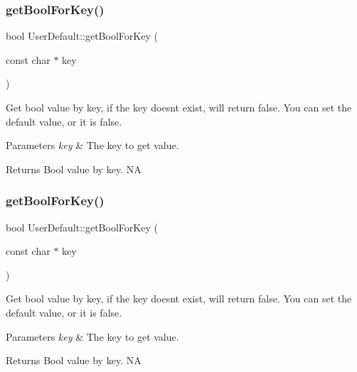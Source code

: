 \subsubsection{\texorpdfstring{get\+Bool\+For\+Key()}{getBoolForKey()}\hspace{0.1cm}{\footnotesize\ttfamily [1/4]}}
{\footnotesize\ttfamily bool User\+Default\+::get\+Bool\+For\+Key (\begin{DoxyParamCaption}\item[{const char $\ast$}]{key }\end{DoxyParamCaption})}

Get bool value by key, if the key doesn\textquotesingle{}t exist, will return false. You can set the default value, or it is false. 
\begin{DoxyParams}{Parameters}
{\em key} & The key to get value. \\
\hline
\end{DoxyParams}
\begin{DoxyReturn}{Returns}
Bool value by {\ttfamily key}.  NA 
\end{DoxyReturn}
\mbox{\label{classUserDefault_a81d252db31d6e11ae2e1ded0e0bdce5c}} 
\subsubsection{\texorpdfstring{get\+Bool\+For\+Key()}{getBoolForKey()}\hspace{0.1cm}{\footnotesize\ttfamily [2/4]}}
{\footnotesize\ttfamily bool User\+Default\+::get\+Bool\+For\+Key (\begin{DoxyParamCaption}\item[{const char $\ast$}]{key }\end{DoxyParamCaption})}

Get bool value by key, if the key doesn\textquotesingle{}t exist, will return false. You can set the default value, or it is false. 
\begin{DoxyParams}{Parameters}
{\em key} & The key to get value. \\
\hline
\end{DoxyParams}
\begin{DoxyReturn}{Returns}
Bool value by {\ttfamily key}.  NA 
\end{DoxyReturn}
\mbox{\label{classUserDefault_ae46d53343463c64e3b6f1d98a3e859e1}} 
